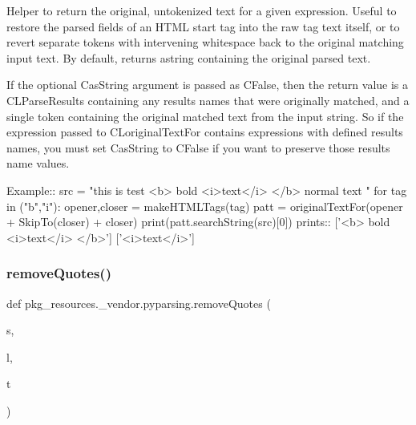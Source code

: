 \begin{DoxyVerb}Helper to return the original, untokenized text for a given expression.  Useful to
restore the parsed fields of an HTML start tag into the raw tag text itself, or to
revert separate tokens with intervening whitespace back to the original matching
input text. By default, returns astring containing the original parsed text.  
   
If the optional C{asString} argument is passed as C{False}, then the return value is a 
C{L{ParseResults}} containing any results names that were originally matched, and a 
single token containing the original matched text from the input string.  So if 
the expression passed to C{L{originalTextFor}} contains expressions with defined
results names, you must set C{asString} to C{False} if you want to preserve those
results name values.

Example::
    src = "this is test <b> bold <i>text</i> </b> normal text "
    for tag in ("b","i"):
        opener,closer = makeHTMLTags(tag)
        patt = originalTextFor(opener + SkipTo(closer) + closer)
        print(patt.searchString(src)[0])
prints::
    ['<b> bold <i>text</i> </b>']
    ['<i>text</i>']
\end{DoxyVerb}
 \mbox{\label{namespacepkg__resources_1_1__vendor_1_1pyparsing_a729162fd1394a1187f7a5e1fb762bf9b}} 
\subsubsection{\texorpdfstring{remove\+Quotes()}{removeQuotes()}}
{\footnotesize\ttfamily def pkg\+\_\+resources.\+\_\+vendor.\+pyparsing.\+remove\+Quotes (\begin{DoxyParamCaption}\item[{}]{s,  }\item[{}]{l,  }\item[{}]{t }\end{DoxyParamCaption})}

